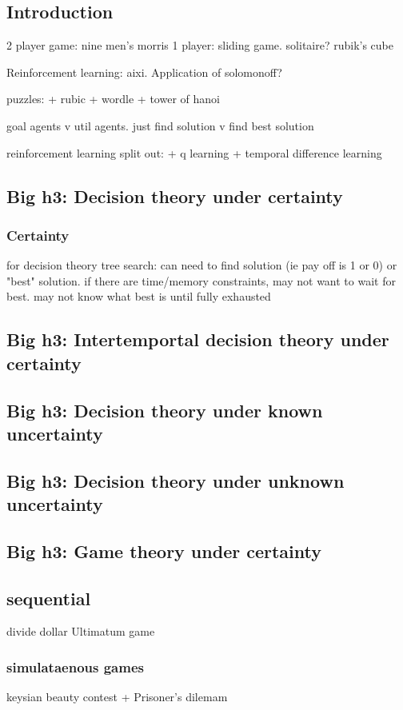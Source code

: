 
\subsection{Introduction}


2 player game: nine men's morris
1 player: sliding game.
solitaire?
rubik's cube

Reinforcement learning: aixi. Application of solomonoff?

puzzles:
+ rubic
+ wordle
+ tower of hanoi

goal agents v util agents. just find solution v find best solution

reinforcement learning split out:
+ q learning
+ temporal difference learning
\subsection{Big h3: Decision theory under certainty}
\subsubsection{Certainty}
for decision theory tree search: can need to find solution (ie pay off is 1 or 0) or "best" solution. if there are time/memory constraints, may not want to wait for best. may not know what best is until fully exhausted
\subsection{Big h3: Intertemportal decision theory under certainty}
\subsection{Big h3: Decision theory under known uncertainty}
\subsection{Big h3: Decision theory under unknown uncertainty}
\subsection{Big h3: Game theory under certainty}
\subsection{sequential}
divide dollar
Ultimatum game
\subsubsection{simulataenous games}
keysian beauty contest
+ Prisoner's dilemam
